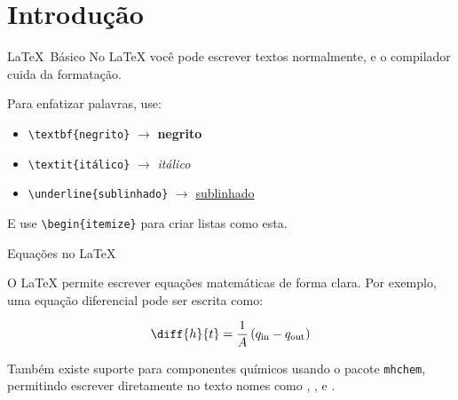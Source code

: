 \section{Introdução}

\begin{frame}{\LaTeX\ Básico}
  No \LaTeX{} você pode escrever textos normalmente, e o compilador cuida da formatação.

  \vspace{2mm}

  Para enfatizar palavras, use:
  \begin{itemize}
    \item \texttt{\textbackslash textbf\{negrito\}} $\rightarrow$ \textbf{negrito}
    \item \texttt{\textbackslash textit\{itálico\}} $\rightarrow$ \textit{itálico}
    \item \texttt{\textbackslash underline\{sublinhado\}} $\rightarrow$ \underline{sublinhado}
  \end{itemize}

  \vspace{4mm}

  E use \texttt{\textbackslash begin\{itemize\}} para criar listas como esta.
\end{frame}

\begin{frame}{Equações no \LaTeX}

  O \LaTeX{} permite escrever equações matemáticas de forma clara.
  Por exemplo, uma equação diferencial pode ser escrita como:

  \begin{equation}
    \diff{h}{t} = \frac{1}{A}\left(q_{\text{in}} - q_{\text{out}}\right)
    \label{eq:tank}
  \end{equation}

  \vspace{4mm}

  Também existe suporte para componentes químicos usando o pacote \texttt{mhchem}, permitindo escrever diretamente no texto nomes como , ,  e .

  \vspace{2mm}

\end{frame}

